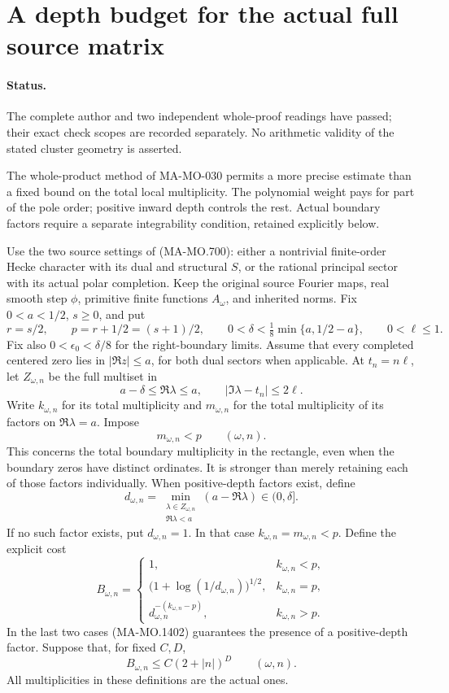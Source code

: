 \section{A depth budget for the actual full source matrix}
\label{sec:weighted-cluster-depth-sufficiency}

\paragraph{Status.}
The complete author and two independent whole-proof readings
have passed; their exact check scopes are recorded separately.
No arithmetic validity of the stated cluster geometry is asserted.

The whole-product method of MA-MO-030 permits a more precise
estimate than a fixed bound on the total local multiplicity.
The polynomial weight pays for part of the pole order; positive
inward depth controls the rest.  Actual boundary factors require
a separate integrability condition, retained explicitly below.

Use the two source settings of (MA-MO.700): either a nontrivial
finite-order Hecke character with its dual and structural $S$,
or the rational principal sector with its actual polar completion.
Keep the original source Fourier maps, real smooth step $\phi$,
primitive finite functions $A_\omega$, and inherited norms.
Fix $0<a<1/2$, $s\ge0$, and put
\[
 r=s/2,\qquad p=r+1/2=(s+1)/2,\qquad
 0<\delta<\tfrac18\min\{a,1/2-a\},\qquad0<\ell\le1.
 \tag{MA-MO.1400}
\]
Fix also $0<\epsilon_0<\delta/8$ for the right-boundary limits.
Assume that every completed centered zero lies in $|\Re z|\le a$,
for both dual sectors when applicable.  At $t_n=n\ell$, let
$Z_{\omega,n}$ be the full multiset in
\[
 a-\delta\le\Re\lambda\le a,
                  \qquad |\Im\lambda-t_n|\le2\ell.
 \tag{MA-MO.1401}
\]
Write $k_{\omega,n}$ for its total multiplicity and
$m_{\omega,n}$ for the total multiplicity of its factors on
$\Re\lambda=a$.  Impose
\[
                         m_{\omega,n}<p
                          \qquad(\omega,n).
 \tag{MA-MO.1402}
\]
This concerns the total boundary multiplicity in the rectangle,
even when the boundary zeros have distinct ordinates.
It is stronger than merely retaining each of those factors
individually.  When positive-depth factors exist, define
\[
 d_{\omega,n}
   =\min_{\substack{\lambda\in Z_{\omega,n}\\\Re\lambda<a}}
                               (a-\Re\lambda)\in(0,\delta].
 \tag{MA-MO.1403}
\]
If no such factor exists, put $d_{\omega,n}=1$.
In that case $k_{\omega,n}=m_{\omega,n}<p$.
Define the explicit cost
\[
 B_{\omega,n}=
 \begin{cases}
 1,&k_{\omega,n}<p,\\
 \bigl(1+\log(1/d_{\omega,n})\bigr)^{1/2},&k_{\omega,n}=p,\\
 d_{\omega,n}^{-(k_{\omega,n}-p)},&k_{\omega,n}>p.
 \end{cases}
 \tag{MA-MO.1404}
\]
In the last two cases (MA-MO.1402) guarantees the presence of
a positive-depth factor.  Suppose that, for fixed $C,D$,
\[
                  B_{\omega,n}\le C(2+|n|)^D
                              \qquad(\omega,n).
 \tag{MA-MO.1405}
\]
All multiplicities in these definitions are the actual ones.

